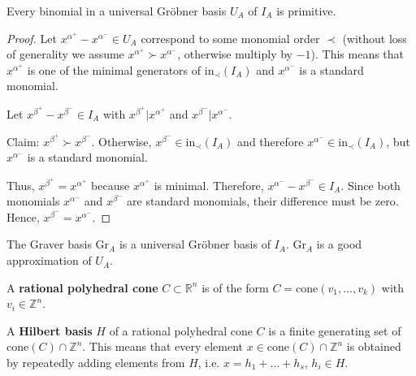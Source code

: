 \documentclass[a4paper, 11pt]{article}
\begin{document}

\begin{mdframed}
\begin{prop}\label{ua_in_gra}
  Every binomial in a universal Gröbner basis \( U_A \) of \( I_A \) is primitive.
\end{prop}
\end{mdframed}

\begin{proof}
  Let \( x^{\alpha^+} - x^{\alpha^-} \in U_A \) correspond to some monomial order \( \prec \) (without loss of generality we assume \( x^{\alpha^+} \succ x^{\alpha^-} \), otherwise multiply by \( -1 \)). This means that \( x^{\alpha^+} \) is one of the minimal generators of \( \mathrm{in}_\prec(I_A) \) and \( x^{\alpha^-} \) is a standard monomial.

  Let \( x^{\beta^+} - x^{\beta^-} \in I_A \) with \( x^{\beta^+} | x^{\alpha^+} \) and \( x^{\beta^-} | x^{\alpha^-} \).

  Claim: \( x^{\beta^+} \succ x^{\beta^-} \). Otherwise, \( x^{\beta^-} \in \mathrm{in}_\prec(I_A) \) and therefore \( x^{\alpha^-} \in \mathrm{in}_\prec(I_A) \), but \( x^{\alpha^-} \) is a standard monomial.


  Thus, \( x^{\beta^+} = x^{\alpha^+} \) because \( x^{\alpha^+} \) is minimal. Therefore, \( x^{\alpha^-} - x^{\beta^-} \in I_A \). Since both monomials \( x^{\alpha^-} \) and \( x^{\beta^-} \) are standard monomials, their difference must be zero. Hence, \( x^{\beta^-} = x^{\alpha^-} \).
\end{proof}

\begin{cor}
  The Graver basis \( \mathrm{Gr}_A \) is a universal Gröbner basis of \( I_A \). \( \mathrm{Gr}_A \) is a good approximation of \( U_A \).
\end{cor}

\begin{defi}
  A \textbf{rational polyhedral cone} \( C \subset \mathbb R^n \) is of the form \( C=  \mathrm{cone}(v_1, \dots, v_k) \) with \( v_i \in \mathbb Z^n \).
\end{defi}

\begin{defi}
  A \textbf{Hilbert basis} \( H \) of a rational polyhedral cone \( C \) is a finite generating set of \( \mathrm{cone}(C) \cap \mathbb Z^n \). This means that every element  \(x \in \mathrm{cone}(C) \cap \mathbb Z^n \) is obtained by repeatedly adding elements from \( H \), i.e. \( x =  h_1 + ... + h_s \), \( h_i \in H \).
\end{defi}
\end{document}
